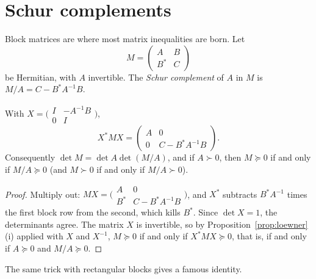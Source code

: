 \section{Schur complements}

Block matrices are where most matrix inequalities are born. Let
\[
M=\begin{pmatrix}A&B\\B^*&C\end{pmatrix}
\]
be Hermitian, with $A$ invertible. The \emph{Schur complement} of $A$ in $M$ is $M/A=C-B^*A^{-1}B$.

\begin{proposition}\label{prop:schurcomplement}
With $X=\bigl(\begin{smallmatrix}I&-A^{-1}B\\0&I\end{smallmatrix}\bigr)$,
\[
X^*MX=\begin{pmatrix}A&0\\0&C-B^*A^{-1}B\end{pmatrix}.
\]
Consequently $\det M=\det A\det(M/A)$, and if $A\succ0$, then $M\succeq0$ if and only if $M/A\succeq0$ (and $M\succ0$ if and only if
$M/A\succ0$).
\end{proposition}
\begin{proof}
Multiply out: $MX=\bigl(\begin{smallmatrix}A&0\\B^*&C-B^*A^{-1}B\end{smallmatrix}\bigr)$, and $X^*$ subtracts $B^*A^{-1}$ times the first block
row from the second, which kills $B^*$. Since $\det X=1$, the determinants agree. The matrix $X$ is invertible, so by
Proposition~\ref{prop:loewner}(i) applied with $X$ and $X^{-1}$, $M\succeq0$ if and only if $X^*MX\succeq0$, that is, if and only if
$A\succeq0$ and $M/A\succeq0$.
\end{proof}

The same trick with rectangular blocks gives a famous identity.

